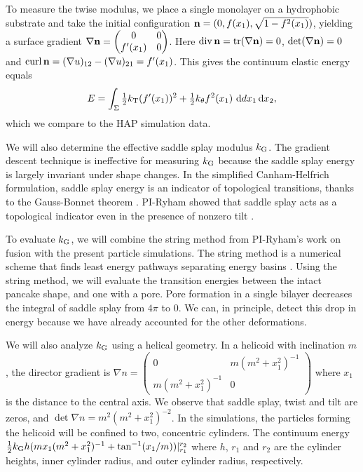 To measure the twise modulus, we place a single monolayer on a hydrophobic substrate 
and take the initial configuration ${\bf n} = (0, f(x_1), \sqrt{1 - f^2(x_1)})$,
yielding a surface gradient $\nabla {\bf n} = \begin{pmatrix}0 & 0\\ f'(x_1) & 0\end{pmatrix}$. 
  Here $\operatorname{div} {\bf n} = \mathrm{tr}(\nabla {\bf n}) = 0$, $\det(\nabla {\bf n}) = 0$ and
  $\operatorname{curl} {\bf n} = (\nabla u)_{12} - (\nabla u)_{21} = f'(x_1)$.
  This gives the continuum elastic energy equals
  \begin{equation}
    \label{eq:twist_energy}
    E = \int_{\Sigma} \tfrac{1}{2}\KT (f'(x_1))^2 + \tfrac{1}{2} \KTH f^2(x_1) \,\dif dx_1 \dif x_2,
  \end{equation}
  which we compare to the HAP simulation data.

We will also determine the effective saddle splay modulus $k_{\mathrm{G}}$. 
The gradient descent technique is ineffective for measuring $k_{\mathrm{G}}$ because
the saddle splay energy is largely invariant under shape changes.
In the simplified Canham-Helfrich formulation, saddle splay energy is an indicator of topological transitions, thanks to the  Gauss-Bonnet theorem
\cite{TerziDeserno17}.
PI-Ryham showed that saddle splay acts as a topological indicator even in the presence of nonzero tilt \cite{RyKlYaCo16}. 

To evaluate $k_{\mathrm{G}}$, we will combine the string method from PI-Ryham's work on fusion \cite{RyKlYaCo16} with
the present particle simulations. The string method is a numerical scheme that finds
least energy pathways separating energy basins \cite{doi:10.1063/1.2720838}.
Using the string method, we will evaluate the transition energies between the intact pancake shape,
and one with a pore. Pore formation in a single bilayer decreases the integral of saddle splay from $4\pi$
to $0$. We can, in principle, detect this drop in energy because we have already accounted for the other deformations. 

We will also analyze $k_{\mathrm{G}}$ using a helical geometry. In a helicoid with inclination $m$, the director
gradient is $\nabla n = \begin{pmatrix} 0 & m(m^2+x_1^2)^{-1} \\ m(m^2+x_1^2)^{-1} & 0\end{pmatrix}$ where $x_1$ is the distance to the central
axis. We observe that saddle splay, twist and tilt are zeros, and $\det \nabla n = m^2(m^2+x_1^2)^{-2}$.
In the simulations, the particles forming the helicoid will be confined to two, concentric cylinders. The
continuum energy $\tfrac{1}{2}k_{\mathrm{G}} h(m x_1(m^2+x_1^2)^{-1} + \tan^{-1}(x_1/m)) |_{r_1}^{r_2}$ where $h$, $r_1$ and $r_2$
are the cylinder heights, inner cylinder radius, and outer cylinder radius, respectively. 

